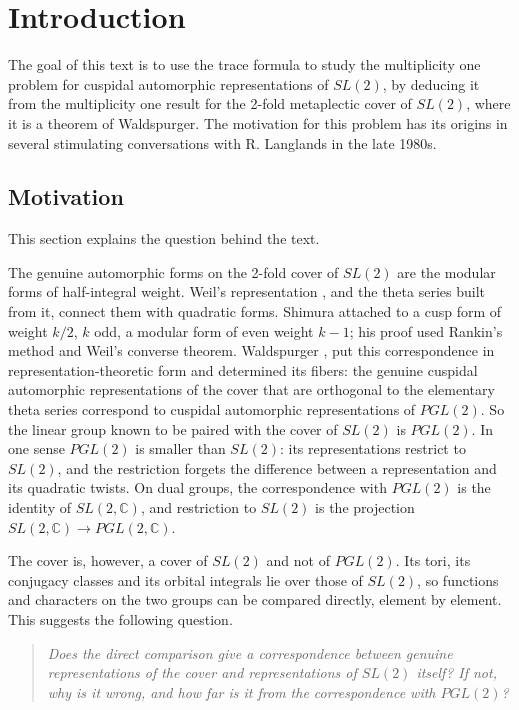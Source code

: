 \documentclass[12pt,letterpaper,openany]{book}
\theoremstyle{plain}
\theoremstyle{definition}
\theoremstyle{remark}
\theoremstyle{remark}
\begin{document}
\tableofcontents

\chapter{Introduction}\label{ch:intro}

The goal of this text is to use the trace formula to study the
multiplicity one problem for cuspidal automorphic representations of
$SL(2)$, by deducing it from the multiplicity one result for
the 2-fold metaplectic cover of $SL(2)$, where it is a theorem
of Waldspurger. The motivation for this problem
has its origins in several stimulating conversations
with R. Langlands in the late 1980s.

\section{Motivation}\label{sec:motivation}

This section explains the question behind the text.

The genuine automorphic forms on the 2-fold cover of $SL(2)$ are the
modular forms of half-integral weight. Weil's representation \cite{We3},
and the theta series built from it, connect them with quadratic forms.
Shimura \cite{Shi} attached to a cusp form of weight $k/2$, $k$ odd, a
modular form of even weight $k-1$; his proof used Rankin's method and
Weil's converse theorem. Waldspurger \cite{Wa1}, \cite{Wa2} put this
correspondence in representation-theoretic form and determined its
fibers: the genuine cuspidal automorphic representations of the cover
that are orthogonal to the elementary theta series correspond to cuspidal
automorphic representations of $PGL(2)$. So the linear group known to be
paired with the cover of $SL(2)$ is $PGL(2)$. In one sense $PGL(2)$ is
smaller than $SL(2)$: its representations restrict to $SL(2)$, and the
restriction forgets the difference between a representation and its
quadratic twists. On dual groups, the correspondence with $PGL(2)$ is the
identity of $SL(2,{\mathbb C})$, and restriction to $SL(2)$ is the
projection $SL(2,{\mathbb C})\rightarrow PGL(2,{\mathbb C})$.

The cover is, however, a cover of $SL(2)$ and not of $PGL(2)$. Its tori,
its conjugacy classes and its orbital integrals lie over those of
$SL(2)$, so functions and characters on the two groups can be compared
directly, element by element. This suggests the following question.

\begin{quote}
\emph{Does the direct comparison give a correspondence between genuine
representations of the cover and representations of $SL(2)$ itself? If
not, why is it wrong, and how far is it from the correspondence with
$PGL(2)$?}
\end{quote}
\end{document}
